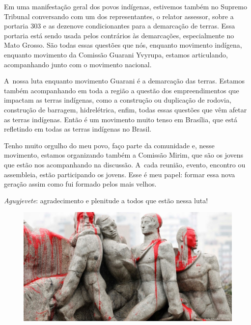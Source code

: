 Em uma manifestação geral dos povos indígenas, estivemos também no
Supremo Tribunal conversando com um dos representantes, o relator
assessor, sobre a portaria 303 e as dezenove condicionantes para a
demarcação de terras. Essa portaria está sendo usada pelos contrários
às demarcações, especialmente no Mato Grosso. São todas essas questões
que nós, enquanto movimento indígena, enquanto movimento da Comissão
Guarani Yvyrupa, estamos articulando, acompanhando junto com o
movimento nacional.

A~nossa luta enquanto movimento Guarani é a demarcação das terras.
Estamos também acompanhando em toda a região a questão dos
empreendimentos que impactam as terras indígenas, como a construção ou
duplicação de rodovia, construção de barragem, hidrelétrica, enfim,
todas essas questões que vêm afetar as terras indígenas. Então é um
movimento muito tenso em Brasília, que está refletindo em todas as
terras indígenas no Brasil.

Tenho muito orgulho do meu povo, faço parte da comunidade e, nesse
movimento, estamos organizando também a Comissão Mirim, que são os
jovens que estão nos acompanhando na discussão. A~cada reunião, evento,
encontro ou assembleia, estão participando os jovens. Esse é meu papel:
formar essa nova geração assim como fui formado pelos mais velhos. 

\emph{Aguyjevete}: agradecimento e plenitude a todos que estão nessa luta!

\pagebreak

\begin{figure}[h]
 \includegraphics[width=\textwidth]{./img/GUARANIS-img2.jpg}	
\end{figure}

